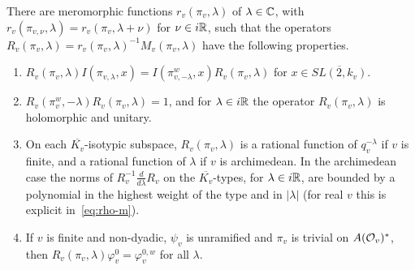 \begin{theorem}\label{thm:normalization}
There are meromorphic functions $r_v(\pi_v,\lambda)$ of $\lambda\in\mathbb{C}$,
with $r_v(\pi_{v,\nu},\lambda)=r_v(\pi_v,\lambda+\nu)$ for $\nu\in i\mathbb{R}$,
such that the operators $R_v(\pi_v,\lambda)=r_v(\pi_v,\lambda)^{-1}
M_v(\pi_v,\lambda)$ have the following properties.
\begin{enumerate}[label=(N\arabic*)]
\item\label{N1} $R_v(\pi_v,\lambda)I(\pi_{v,\lambda},x)=I(\pi^w_{v,-\lambda},x)
  R_v(\pi_v,\lambda)$ for $x\in\overline{SL(2,k_v)}$.
\item\label{N2} $R_v(\pi_v^w,-\lambda)R_v(\pi_v,\lambda)=1$, and for
  $\lambda\in i\mathbb{R}$ the operator $R_v(\pi_v,\lambda)$ is holomorphic and
  unitary.
\item\label{N3} On each $\overline{K_v}$-isotypic subspace,
  $R_v(\pi_v,\lambda)$ is a rational function of $q_v^{-\lambda}$ if $v$
  is finite, and a rational function of $\lambda$ if $v$ is archimedean.
  In the archimedean case the norms of $R_v^{-1}\frac{d}{d\lambda}R_v$ on
  the $\overline{K_v}$-types, for $\lambda\in i\mathbb{R}$, are bounded by a
  polynomial in the highest weight of the type and in $|\lambda|$ (for
  real $v$ this is explicit in~\eqref{eq:rho-m}).
\item\label{N4} If $v$ is finite and non-dyadic, $\psi_v$ is unramified
  and $\pi_v$ is trivial on $A(\mathcal{O}_v)^*$, then
  $R_v(\pi_v,\lambda)\varphi^0_v=\varphi^{0,w}_v$ for all $\lambda$.
\end{enumerate}
\end{theorem}

